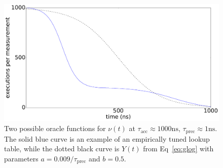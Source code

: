 \documentclass[conference]{IEEEtran}
\begin{document}
\begin{figure}
\centering
\includegraphics[width=\columnwidth]{figures/fig5/oracle}
\caption{Two possible oracle functions for $\nu(t)$ at $\tau_{\textrm{acc}} \approx 1000 \textrm{ns}$, $\tau_\textrm{prec} \approx 1 \textrm{ns}$.
The solid blue curve is an example of an empirically tuned lookup table, while
the dotted black curve is $Y(t)$ from Eq~\ref{eq:glog} with parameters $a =
0.009 / \tau_\textrm{prec}$ and $b = 0.5$.}
\label{fig:oracle}
\end{figure}
\end{document}
